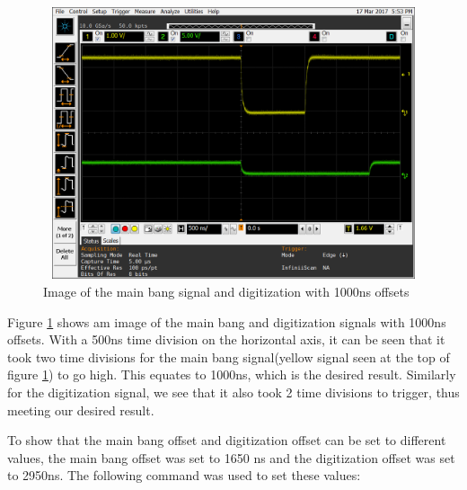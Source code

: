 \documentclass[12pt, a4paper]{article}
\begin{document}
	\begin{figure}[t]
		\centering
		\includegraphics[width=13cm, height=8cm]{1khz_mb_offset_1000_ns_length_of_offset}
		\caption{Image of the main bang signal and digitization with 1000ns offsets}
		\label{fig:1kHz_in_1000_offset}
	\end{figure}
	

Figure \ref{fig:1kHz_in_1000_offset} shows am image of the main bang and digitization signals with 1000ns offsets. With a 500ns time division on the horizontal axis, it can be seen that it took two time divisions for the main bang signal(yellow signal seen at the top of figure \ref{fig:1kHz_in_1000_offset}) to go high. This equates to 1000ns, which is the desired result. Similarly for the digitization signal, we see that it also took 2 time divisions to trigger, thus meeting our desired result. 

To show that the main bang offset and digitization offset can be set to different values, the main bang offset was set to 1650 ns and the digitization offset was set to 2950ns. The following command was used to set these values:

		
\end{document}
